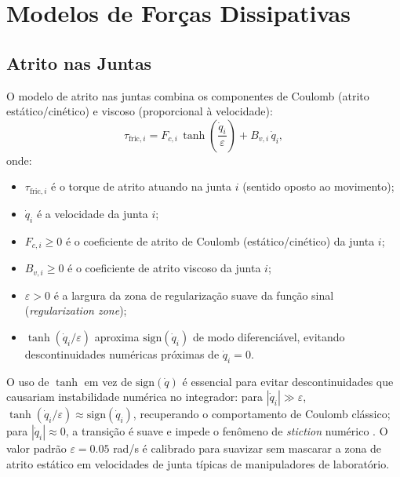 \section{Modelos de Forças Dissipativas}
\label{sec:dissipative}

\subsection{Atrito nas Juntas}

O modelo de atrito nas juntas combina os componentes de Coulomb (atrito estático/cinético) e viscoso (proporcional à velocidade):
\begin{equation}
    \tau_{\text{fric},i} = F_{c,i}\,\tanh\!\left(\frac{\dot{q}_i}{\varepsilon}\right) + B_{v,i}\,\dot{q}_i,
    \label{eq:friction}
\end{equation}
onde:
\begin{itemize}
    \item $\tau_{\text{fric},i}$ é o torque de atrito atuando na junta $i$ (sentido oposto ao movimento);
    \item $\dot{q}_i$ é a velocidade da junta $i$;
    \item $F_{c,i} \geq 0$ é o coeficiente de atrito de Coulomb (estático/cinético) da junta $i$;
    \item $B_{v,i} \geq 0$ é o coeficiente de atrito viscoso da junta $i$;
    \item $\varepsilon > 0$ é a largura da zona de regularização suave da função sinal (\textit{regularization zone});
    \item $\tanh(\dot{q}_i/\varepsilon)$ aproxima $\text{sign}(\dot{q}_i)$ de modo diferenciável, evitando descontinuidades numéricas próximas de $\dot{q}_i = 0$.
\end{itemize} O uso de $\tanh$ em vez de $\text{sign}(\dot{q})$ é essencial para evitar descontinuidades que causariam instabilidade numérica no integrador: para $|\dot{q}_i| \gg \varepsilon$, $\tanh(\dot{q}_i/\varepsilon) \approx \text{sign}(\dot{q}_i)$, recuperando o comportamento de Coulomb clássico; para $|\dot{q}_i| \approx 0$, a transição é suave e impede o fenômeno de \textit{stiction} numérico \cite{slotine1991applied}. O valor padrão $\varepsilon = 0.05$ rad/s é calibrado para suavizar sem mascarar a zona de atrito estático em velocidades de junta típicas de manipuladores de laboratório.


